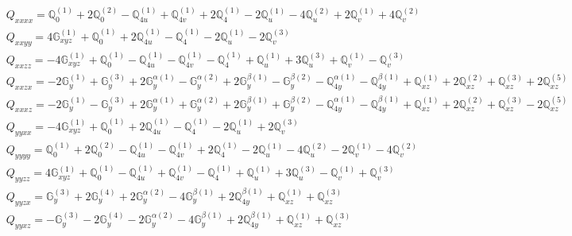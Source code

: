 \documentclass[fleqn,8pt,landscape]{jsarticle}
\begin{document}
\begin{align*}
& Q_{xxxx} = \mathbb{Q}_{0}^{(1)} + 2 \mathbb{Q}_{0}^{(2)} - \mathbb{Q}_{4u}^{(1)} + \mathbb{Q}_{4v}^{(1)} + 2 \mathbb{Q}_{4}^{(1)} - 2 \mathbb{Q}_{u}^{(1)} - 4 \mathbb{Q}_{u}^{(2)} + 2 \mathbb{Q}_{v}^{(1)} + 4 \mathbb{Q}_{v}^{(2)} \\
& Q_{xxyy} = 4 \mathbb{G}_{xyz}^{(1)} + \mathbb{Q}_{0}^{(1)} + 2 \mathbb{Q}_{4u}^{(1)} - \mathbb{Q}_{4}^{(1)} - 2 \mathbb{Q}_{u}^{(1)} - 2 \mathbb{Q}_{v}^{(3)} \\
& Q_{xxzz} = - 4 \mathbb{G}_{xyz}^{(1)} + \mathbb{Q}_{0}^{(1)} - \mathbb{Q}_{4u}^{(1)} - \mathbb{Q}_{4v}^{(1)} - \mathbb{Q}_{4}^{(1)} + \mathbb{Q}_{u}^{(1)} + 3 \mathbb{Q}_{u}^{(3)} + \mathbb{Q}_{v}^{(1)} - \mathbb{Q}_{v}^{(3)} \\
& Q_{xxzx} = - 2 \mathbb{G}_{y}^{(1)} + \mathbb{G}_{y}^{(3)} + 2 \mathbb{G}_{y}^{\alpha(1)} - \mathbb{G}_{y}^{\alpha(2)} + 2 \mathbb{G}_{y}^{\beta(1)} - \mathbb{G}_{y}^{\beta(2)} - \mathbb{Q}_{4y}^{\alpha(1)} - \mathbb{Q}_{4y}^{\beta(1)} + \mathbb{Q}_{xz}^{(1)} + 2 \mathbb{Q}_{xz}^{(2)} + \mathbb{Q}_{xz}^{(3)} + 2 \mathbb{Q}_{xz}^{(5)} \\
& Q_{xxxz} = - 2 \mathbb{G}_{y}^{(1)} - \mathbb{G}_{y}^{(3)} + 2 \mathbb{G}_{y}^{\alpha(1)} + \mathbb{G}_{y}^{\alpha(2)} + 2 \mathbb{G}_{y}^{\beta(1)} + \mathbb{G}_{y}^{\beta(2)} - \mathbb{Q}_{4y}^{\alpha(1)} - \mathbb{Q}_{4y}^{\beta(1)} + \mathbb{Q}_{xz}^{(1)} + 2 \mathbb{Q}_{xz}^{(2)} + \mathbb{Q}_{xz}^{(3)} - 2 \mathbb{Q}_{xz}^{(5)} \\
& Q_{yyxx} = - 4 \mathbb{G}_{xyz}^{(1)} + \mathbb{Q}_{0}^{(1)} + 2 \mathbb{Q}_{4u}^{(1)} - \mathbb{Q}_{4}^{(1)} - 2 \mathbb{Q}_{u}^{(1)} + 2 \mathbb{Q}_{v}^{(3)} \\
& Q_{yyyy} = \mathbb{Q}_{0}^{(1)} + 2 \mathbb{Q}_{0}^{(2)} - \mathbb{Q}_{4u}^{(1)} - \mathbb{Q}_{4v}^{(1)} + 2 \mathbb{Q}_{4}^{(1)} - 2 \mathbb{Q}_{u}^{(1)} - 4 \mathbb{Q}_{u}^{(2)} - 2 \mathbb{Q}_{v}^{(1)} - 4 \mathbb{Q}_{v}^{(2)} \\
& Q_{yyzz} = 4 \mathbb{G}_{xyz}^{(1)} + \mathbb{Q}_{0}^{(1)} - \mathbb{Q}_{4u}^{(1)} + \mathbb{Q}_{4v}^{(1)} - \mathbb{Q}_{4}^{(1)} + \mathbb{Q}_{u}^{(1)} + 3 \mathbb{Q}_{u}^{(3)} - \mathbb{Q}_{v}^{(1)} + \mathbb{Q}_{v}^{(3)} \\
& Q_{yyzx} = \mathbb{G}_{y}^{(3)} + 2 \mathbb{G}_{y}^{(4)} + 2 \mathbb{G}_{y}^{\alpha(2)} - 4 \mathbb{G}_{y}^{\beta(1)} + 2 \mathbb{Q}_{4y}^{\beta(1)} + \mathbb{Q}_{xz}^{(1)} + \mathbb{Q}_{xz}^{(3)} \\
& Q_{yyxz} = - \mathbb{G}_{y}^{(3)} - 2 \mathbb{G}_{y}^{(4)} - 2 \mathbb{G}_{y}^{\alpha(2)} - 4 \mathbb{G}_{y}^{\beta(1)} + 2 \mathbb{Q}_{4y}^{\beta(1)} + \mathbb{Q}_{xz}^{(1)} + \mathbb{Q}_{xz}^{(3)} \\

\end{align*}
\end{document}
